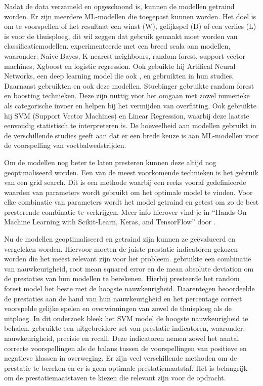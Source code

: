 Nadat de data verzameld en opgeschoond is, kunnen de modellen getraind worden. Er zijn meerdere ML-modellen die toegepast kunnen worden. Het doel is om te voorspellen of het resultaat een winst (W), gelijkspel (D) of een verlies (L) is voor de thuisploeg, dit wil zeggen dat gebruik gemaakt moet worden van classificatiemodellen.
\textcite{Rodrigues2022} experimenteerde met een breed scala aan modellen, waaronder: Naive Bayes, K-nearest neighbours, random forest, support vector machines, Xgboost en logistic regression. Ook gebuikte hij Artifical Neural Networks, een deep learning model die ook \textcite{Bunker2019}, \textcite{Carloni2021} en \textcite{Azeman2020} gebruikten in hun studies. 
Daarnaast gebruikten \textcite{Stuebinger2019} en \textcite{KevinAndrews2021} ook deze modellen. Stuebinger gebruikte random forest en boosting technieken. Deze zijn nuttig voor het omgaan met zowel numerieke als categorische invoer en helpen bij het vermijden van overfitting. Ook gebruikte hij SVM (Support Vector Machines) en Linear Regression, waarbij deze laatste eenvoudig statistisch te interpreteren is.
De hoeveelheid aan modellen gebruikt in de verschillende studies geeft aan dat er een brede keuze is aan ML-modellen voor de voorspelling van voetbalwedstrijden.

Om de modellen nog beter te laten presteren kunnen deze altijd nog geoptimaliseerd worden. Een van de meest voorkomende technieken is het gebruik van een grid search. Dit is een methode waarbij een reeks vooraf gedefinieerde waarden van parameters wordt gebruikt om het optimale model te vinden. Voor elke combinatie van parameters wordt het model getraind en getest om zo de best presterende combinatie te verkrijgen. Meer info hierover vind je in “Hands-On Machine Learning with Scikit-Learn, Keras, and TensorFlow” door \autocite{Geron2019}.

Nu de modellen geoptimaliseerd en getraind zijn kunnen ze geëvalueerd en vergeleken worden. Hiervoor moeten de juiste prestatie indicatoren gekozen worden die het meest relevant zijn voor het probleem.
\textcite{Stuebinger2019} gebruikte een combinatie van nauwkeurigheid, root mean squared error en de mean absolute deviation om de prestaties van hun modellen te berekenen. Hierbij presteerde het random forest model het beste met de hoogste nauwkeurigheid.
Daarentegen beoordeelde \textcite{Rodrigues2022} de prestaties aan de hand van hun nauwkeurigheid en het percentage correct voorspelde gelijke spelen en overwinningen van zowel de thuisploeg als de uitploeg. In dit onderzoek bleek het SVM model de hoogste nauwkeurigheid te behalen.
\textcite{Azeman2020} gebruikte een uitgebreidere set van prestatie-indicatoren, waaronder: nauwkeurigheid, precisie en recall. Deze indicatoren nemen zowel het aantal correcte voorspellingen als de balans tussen de voorspellingen van positieve en negatieve klassen in overweging.
Er zijn veel verschillende methoden om de prestatie te bereken en er is geen optimale prestatiemaatstaf. Het is belangrijk om de prestatiemaatstaven te kiezen die relevant zijn voor de opdracht.

